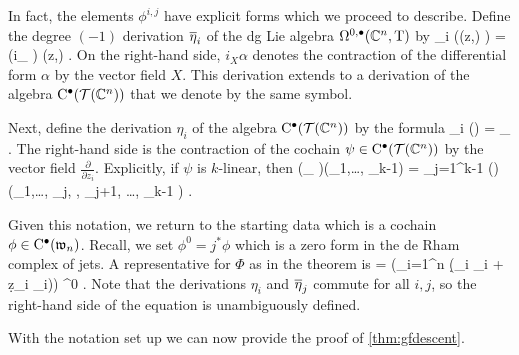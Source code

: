 \documentclass[11pt]{amsart}
\numberwithin{equation}{section}
\def\tangent{{\rm T}}
\begin{document}
In fact, the elements $\phi^{i,j}$ have explicit forms which we proceed to describe. 
Define the degree $(-1)$ derivation $\Bar{\eta}_i$ of the dg Lie algebra $\Omega^{0,\bu}(\CC^n, \tangent)$ by 
\beqn\label{eqn:holdescent}
\Bar{\eta}_i \left(\alpha(z,\zbar)  \right) = \left(i_{} \alpha \right) (z,\zbar)  .
\eeqn
On the right-hand side, $i_X \alpha$ denotes the contraction of the differential form $\alpha$ by the vector field $X$. 
This derivation extends to a derivation of the algebra $\clie^\bu(\cT(\CC^n))$ that we denote by the same symbol. 

Next, define the derivation $\eta_i$ of the algebra $\clie^\bu(\cT(\CC^n))$ by the formula
\beqn\label{eqn:cartandescent}
\eta_i (\psi) = \iota_{} \psi .
\eeqn
The right-hand side is the contraction of the cochain $\psi \in \clie^\bu(\cT(\CC^n))$ by the vector field $\frac{\partial}{\partial z_i}$. 
Explicitly, if $\psi$ is $k$-linear, then 
\beqn
(\iota_{} \psi)(\xi_1,\ldots, \xi_{k-1}) = \sum_{j=1}^{k-1} (\pm) \psi\left(\xi_1,\ldots, \xi_j, , \xi_{j+1}, \ldots, \xi_{k-1} \right) .
\eeqn

Given this notation, we return to the starting data which is a cochain $\phi \in \clie^\bu(\fw_n)$.
Recall, we set $\phi^0 = j^* \phi$ which is a zero form in the de Rham complex of jets. 
A representative for $\Phi$ as in the theorem is
\beqn\label{eqn:Phi}
\Phi = \exp\left(\sum_{i=1}^n \left(\d \zbar_i \Bar{\eta}_i + \d z_i \eta_i\right)\right) \phi^0 . 
\eeqn
Note that the derivations $\eta_i$ and $\Bar{\eta}_j$ commute for all $i,j$, so the right-hand side of the equation is unambiguously defined. 

With the notation set up we can now provide the proof of \ref{thm:gfdescent}. 
\end{document}
